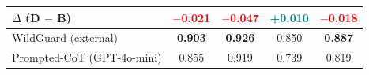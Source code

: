 \documentclass[superintelligence,article,accept,moreauthors]{Definitions/mdpi}
\newcommand{\authchg}[1]{\textcolor{blue}{#1}}
\begin{document}
\begin{table}[H]
\begin{tabularx}{\textwidth}{lCCCC}
    $\Delta$ (D $-$ B)
      & \textcolor{red}{$-$0.021}
      & \textcolor{red}{$-$0.047}
      & \textcolor{teal}{+0.010}
      & \textcolor{red}{$-$0.018} \\

    \midrule
    WildGuard (external)
      & \textbf{0.903}
      & \textbf{0.926}
      & 0.850
      & \textbf{0.887} \\

    Prompted-CoT (GPT-4o-mini)
      & 0.855
      & 0.919
      & 0.739
      & 0.819 \\

    \bottomrule
  \end{tabularx}
\noindent{\small{\authchg{Teal and red indicate a positive and a negative difference, respectively.}}}
\end{table}
\end{document}
